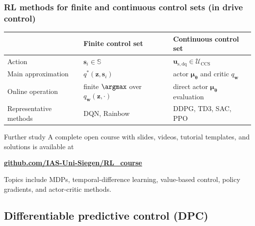 \begin{frame}
	\frametitle{RL methods for finite and continuous control sets (in drive control)}
	\begin{center}
		\begin{tabular}{p{}p{}p{}}
			\toprule
			                       & \textbf{Finite control set}                      & \textbf{Continuous control set}                                \\
			\midrule
			Action                 & $\bm{s}_i\in\mathbb{S}$                          & $\bm{u}_{\mathrm{s},\mathrm{dq}}\in\mathcal{U}_{\mathrm{CCS}}$ \\[1mm]
			Main approximation     & $q^{*}(\bm{z},\bm{s}_i)$                         & actor $\bm{\mu}_{\bm{\theta}}$ and critic $q_{\bm{w}}$         \\[1mm]
			Online operation       & finite $\argmax$ over $q_{\bm{w}}(\bm{z},\cdot)$ & direct actor $\bm{\mu}_{\bm{\theta}}$ evaluation               \\[1mm]
			Representative methods & DQN, Rainbow                                     & DDPG, TD3, SAC, PPO                                            \\
			\bottomrule
		\end{tabular}
	\end{center}\pause%
	\begin{block}{Further study}
		A complete open course with slides, videos, tutorial templates, and solutions is available at
		\begin{center}
			\href{https://github.com/IAS-Uni-Siegen/RL_course}
			{\textbf{github.com/IAS-Uni-Siegen/RL\_course}}
		\end{center}
		Topics include MDPs, temporal-difference learning, value-based control, policy gradients, and actor-critic methods.
	\end{block}
\end{frame}

\subsection{Differentiable predictive control (DPC)}


